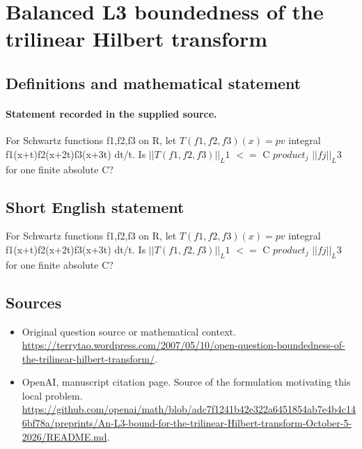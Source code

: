 \documentclass[11pt]{article}
\begin{document}
\section*{Balanced L3 boundedness of the trilinear Hilbert transform}\label{statement}
\subsection{Definitions and mathematical statement}
\paragraph{Statement recorded in the supplied source.}
For Schwartz functions f1,f2,f3 on R, let $T(f1,f2,f3)(x)=pv$ integral f1(x+t)f2(x+2t)f3(x+3t) dt/t. Is $||T(f1,f2,f3)||_L1$ $<=$ C $product_j$ $||fj||_L3$ for one finite absolute C?
\subsection{Short English statement}
For Schwartz functions f1,f2,f3 on R, let $T(f1,f2,f3)(x)=pv$ integral f1(x+t)f2(x+2t)f3(x+3t) dt/t. Is $||T(f1,f2,f3)||_L1$ $<=$ C $product_j$ $||fj||_L3$ for one finite absolute C?
\subsection{Sources}
\begin{itemize}
\item[S1] Original question source or mathematical context.
\url{https://terrytao.wordpress.com/2007/05/10/open-question-boundedness-of-the-trilinear-hilbert-transform/}.
\item[S2] OpenAI, manuscript citation page. Source of the formulation motivating this local problem.
\url{https://github.com/openai/math/blob/adc7f1241b42e322a6451854ab7e4b4c146bf78a/preprints/An-L3-bound-for-the-trilinear-Hilbert-transform-October-5-2026/README.md}.
\end{itemize}
\end{document}
